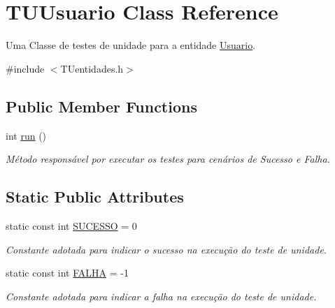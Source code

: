 \hypertarget{classTUUsuario}{}\section{T\+U\+Usuario Class Reference}
\label{classTUUsuario}


Uma Classe de testes de unidade para a entidade \hyperlink{classUsuario}{Usuario}.  




{\ttfamily \#include $<$T\+Uentidades.\+h$>$}

\subsection*{Public Member Functions}
\begin{DoxyCompactItemize}
\item 
int \hyperlink{classTUUsuario_af12e1b9020cfb11a1f659373a70268fa}{run} ()
\begin{DoxyCompactList}\small\item\em Método responsável por executar os testes para cenários de Sucesso e Falha. \end{DoxyCompactList}\end{DoxyCompactItemize}
\subsection*{Static Public Attributes}
\begin{DoxyCompactItemize}
\item 
\mbox{\label{classTUUsuario_aa9302e7d6f13452c83f21224fd335e54}} 
static const int \hyperlink{classTUUsuario_aa9302e7d6f13452c83f21224fd335e54}{S\+U\+C\+E\+S\+SO} = 0
\begin{DoxyCompactList}\small\item\em Constante adotada para indicar o sucesso na execução do teste de unidade. \end{DoxyCompactList}\item 
\mbox{\label{classTUUsuario_af1a7217e0d002f0d0b524c901bb75c98}} 
static const int \hyperlink{classTUUsuario_af1a7217e0d002f0d0b524c901bb75c98}{F\+A\+L\+HA} = -\/1
\begin{DoxyCompactList}\small\item\em Constante adotada para indicar a falha na execução do teste de unidade. \end{DoxyCompactList}\end{DoxyCompactItemize}


